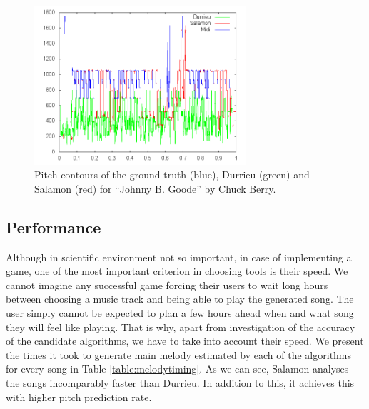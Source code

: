 \begin{figure}[b]
	\centering
   \includegraphics[width=0.7\textwidth]{Figures/Johnny}
\caption{Pitch contours of the ground truth (blue), Durrieu (green) and Salamon (red) for ``Johnny B. Goode'' by Chuck Berry.}
\label{fig:jonny}
\end{figure}



\vspace{10pt}

\subsection{Performance}

Although in scientific environment not so important, in case of implementing a game, one of the most important criterion in choosing tools is their speed. We cannot imagine any successful game forcing their users to wait long hours between choosing a music track and being able to play the generated song. The user simply cannot be expected to plan a few hours ahead when and what song they will feel like playing. That is why, apart from investigation of the accuracy of the candidate algorithms, we have to take into account their speed. We present the times it took to generate main melody estimated by each of the algorithms for every song in Table \ref{table:melodytiming}. As we can see, Salamon analyses the songs incomparably faster than Durrieu. In addition to this, it achieves this with higher pitch prediction rate.


\vspace{20pt}

